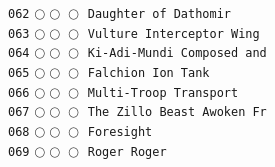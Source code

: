 \documentclass[a4paper,landscape]{article}
\begin{document}
\begin{multicols*}{5}
\texttt{062} \(\bigcirc\!\bigcirc\!\bigcirc\)  \texttt{Daughter of Dathomir} \vspace{-0.3mm}\\ 
\texttt{063} \(\bigcirc\!\bigcirc\!\bigcirc\)  \texttt{Vulture Interceptor Wing} \vspace{-0.3mm}\\ 
\texttt{064} \(\bigcirc\!\bigcirc\!\bigcirc\)  \texttt{Ki-Adi-Mundi Composed and} \vspace{-0.3mm}\\ 
\texttt{065} \(\bigcirc\!\bigcirc\!\bigcirc\)  \texttt{Falchion Ion Tank} \vspace{-0.3mm}\\ 
\texttt{066} \(\bigcirc\!\bigcirc\!\bigcirc\)  \texttt{Multi-Troop Transport} \vspace{-0.3mm}\\ 
\texttt{067} \(\bigcirc\!\bigcirc\!\bigcirc\)  \texttt{The Zillo Beast Awoken Fr} \vspace{-0.3mm}\\ 
\texttt{068} \(\bigcirc\!\bigcirc\!\bigcirc\)  \texttt{Foresight} \vspace{-0.3mm}\\ 
\texttt{069} \(\bigcirc\!\bigcirc\!\bigcirc\)  \texttt{Roger Roger} \vspace{-0.3mm}\\ 

\end{multicols*}
\end{document}
